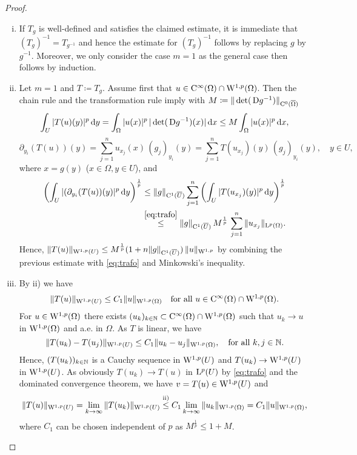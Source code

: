 \begin{proof}
  \begin{enumerate}[i)]
    \item If $T_g$ is well-defined and satisfies the claimed estimate, it is immediate that $(T_g)^{-1} = T_{g^{-1}}$ and hence the estimate for $(T_g)^{-1}$ follows by replacing $g$ by $g^{-1}$.
      Moreover, we only consider the case $m = 1$ as the general case then follows by induction.
    \item Let $m = 1$ and $T \coloneqq T_g$.
      Assume first that $u \in \mathrm{C}^\infty(\Omega) \cap \mathrm{W}^{1,p}(\Omega)$.
      Then the chain rule and the transformation rule imply with $M \coloneqq \|\det(\,{\operatorname{D}} g^{-1})\|_{\mathrm{C}^0(\overline{\Omega})}$
  \begin{equation}
    \label{eq:trafo}
    \int_U |T(u)(y)|^p \, {\operatorname{d}\!{y}}
     = \int_\Omega |u(x)|^p \, |\det(\,{\operatorname{D}} g^{-1})(x)| \, {\operatorname{d}\!{x}}
    \leq M \int_\Omega |u(x)|^p \, {\operatorname{d}\!{x}},
  \end{equation}
  $$
  \partial_{y_i} (T(u))(y)
  = \sum_{j = 1}^n u_{x_j}(x) \, (g_j)_{y_i}(y)
  = \sum_{j = 1}^n T(u_{x_j})(y) \, (g_j)_{y_i}(y), \quad y \in U,
  $$
  where $x = g(y)$ ($x \in \Omega, y \in U$), and
  \begin{align*}
    \left( \int_U |(\partial_{y_i}(T(u))(y)|^p \, {\operatorname{d}\!{y}}\right)^{\frac{1}{p}}
    & \leq \|g\|_{\mathrm{C}^1(\overline U)} \sum_{j = 1}^n \left( \int_U |T(u_{x_j})(y)|^p \, {\operatorname{d}\!{y}} \right)^{\frac{1}{p}} \\
    & \overset{\eqref{eq:trafo}}{\leq} \|g\|_{\mathrm{C}^1(\overline U)} \, M^{\frac{1}{p}} \, \sum_{j = 1}^n \|u_{x_j} \|_{\mathrm{L}^p(\Omega)}.
  \end{align*}
  Hence, $\|T(u)\|_{\mathrm{W}^{1,p}(U)} \leq M^{\frac{1}{p}} (1 + n\|g\|_{\mathrm{C}^1(\overline U)}) \, \|u\|_{\mathrm{W}^{1,p}}$ by combining the previous estimate with \eqref{eq:trafo} and Minkowski's inequality.
\item By ii) we have
  $$
  \|T(u)\|_{\mathrm{W}^{1,p}(U)} \leq C_1 \|u\|_{\mathrm{W}^{1,p}(\Omega)} \quad \text{for all } u \in \mathrm{C}^\infty(\Omega) \cap \mathrm{W}^{1,p}(\Omega).
  $$
  For $u \in \mathrm{W}^{1,p}(\Omega)$ there exists $(u_k)_{k \in \mathbb{N}} \subset \mathrm{C}^\infty(\Omega) \cap \mathrm{W}^{1,p}(\Omega)$ such that $u_k \to u$ in $\mathrm{W}^{1,p}(\Omega)$ and a.e. in $\Omega$.
  As $T$ is linear, we have
  $$
  \| T(u_k) - T(u_j)\|_{\mathrm{W}^{1,p}(U)} \leq C_1 \|u_k - u_j\|_{\mathrm{W}^{1,p}(\Omega)}, \quad\text{for all } k,j \in \mathbb{N}.
  $$
  Hence, $(T(u_k))_{k \in \mathbb{N}}$ is a Cauchy sequence in $\mathrm{W}^{1,p}(U)$ and $T(u_k) \to \mathrm{W}^{1,p}(U)$ in $\mathrm{W}^{1,p}(U)$.
  As obviously $T(u_k) \to T(u)$ in $\mathrm{L}^p(U)$ by \eqref{eq:trafo} and the dominated convergence theorem, we have $v = T(u) \in \mathrm{W}^{1,p}(U)$ and 
  $$
  \| T(u) \|_{\mathrm{W}^{1,p}(U)} 
  = \lim_{k \to \infty} \|T(u_k)\|_{\mathrm{W}^{1,p}(U)}
      \overset{\text{ii)}}\leq C_1 \lim_{k \to \infty} \|u_k\|_{\mathrm{W}^{1,p}(\Omega)}
  = C_1 \|u\|_{\mathrm{W}^{1,p}(\Omega)},
  $$
  where $C_1$ can be chosen independent of $p$ as $M^{\frac{1}{p}} \leq 1 + M$. \qedhere
  \end{enumerate}
\end{proof}

